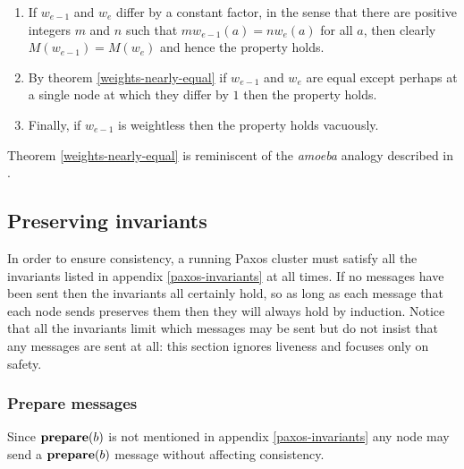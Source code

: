 \documentclass[journal]{IEEEtran}
\begin{document}
\begin{enumerate}

\item If $w_{e-1}$ and $w_e$ differ by a constant factor, in the sense that
there are positive integers $m$ and $n$ such that $m w_{e-1}(a) = n w_e(a)$ for
all $a$, then clearly ${M(w_{e-1}) = M(w_e)}$ and hence the property holds.

\item By theorem \ref{weights-nearly-equal} if $w_{e-1}$ and $w_e$ are equal
except perhaps at a single node at which they differ by $1$ then the property
holds.

\item Finally, if $w_{e-1}$ is weightless then the property holds vacuously.

\end{enumerate}

Theorem \ref{weights-nearly-equal} is reminiscent of the \textit{amoeba}
analogy described in \cite{cheap-paxos}.

\subsection{Preserving invariants}

In order to ensure consistency, a running Paxos cluster must satisfy all the
invariants listed in appendix \ref{paxos-invariants} at all times. If no
messages have been sent then the invariants all certainly hold, so as long as
each message that each node sends preserves them then they will always hold by
induction. Notice that all the invariants limit which messages may be sent but
do not insist that any messages are sent at all: this section ignores liveness
and focuses only on safety.

\subsubsection{Prepare messages} Since $\mathbf{prepare}(b)$ is not mentioned in appendix
\ref{paxos-invariants} any node may send a $\mathbf{prepare}(b)$ message without affecting
consistency.
\end{document}
